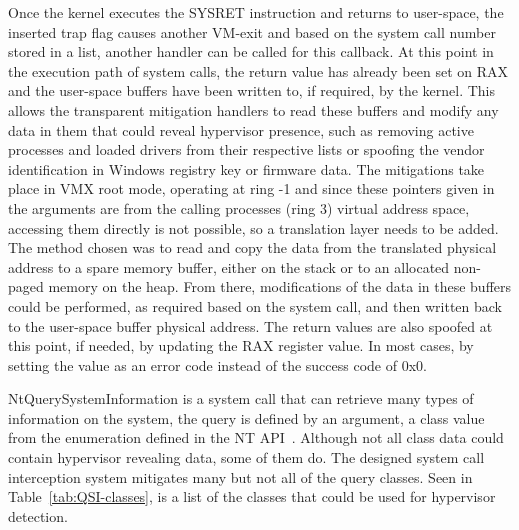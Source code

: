 Once the kernel executes the SYSRET instruction and returns to user-space, the inserted trap flag causes another VM-exit and based on the system call number stored in a list, 
another handler can be called for this callback. At this point in the execution path of system calls, the return value has already been set on RAX and the user-space buffers 
have been written to, if required, by the kernel. This allows the transparent mitigation handlers to read these buffers and modify any data in them 
that could reveal hypervisor presence, such as removing active processes and loaded drivers from their respective lists 
or spoofing the vendor identification in Windows registry key or firmware data.
The mitigations take place in VMX root mode, operating at ring -1 and since these pointers given in the arguments are from the calling processes (ring 3) virtual address space, 
accessing them directly is not possible, so a translation layer needs to be added. The method chosen was to read and copy the data from the translated physical address to a spare memory buffer, 
either on the stack or to an allocated non-paged memory on the heap. From there, modifications of the data in these buffers could be performed, as required based on the system call, 
and then written back to the user-space buffer physical address.
The return values are also spoofed at this point, if needed, by updating the RAX register value. In most cases, by setting the value as an error code instead of the success code of 0x0. 

NtQuerySystemInformation is a system call that can retrieve many types of information on the system, the query is defined by an argument, 
a class value from the  enumeration defined in the NT API~\cite{ntdll-lib}. 
Although not all class data could contain hypervisor revealing data, some of them do. The designed system call interception system mitigates many 
but not all of the query classes. Seen in Table~\ref{tab:QSI-classes}, is a list of the  classes that could be used for hypervisor detection.

